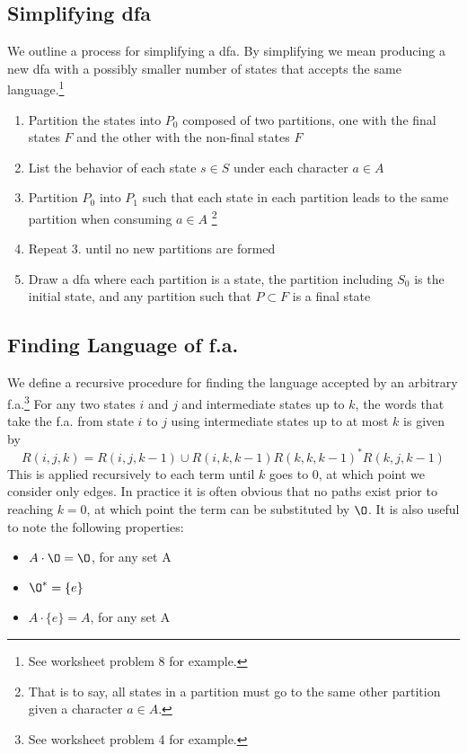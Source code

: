 \documentclass{article}
\begin{document}
		\subsection{Simplifying dfa}
		We outline a process for simplifying a dfa. By simplifying we mean producing a new dfa with a possibly smaller number of states that accepts the same language.\footnote{See worksheet problem 8 for example.}
		\begin{enumerate}
			\item Partition the states into $P_0$ composed of two partitions, one with the final states $F$ and the other with the non-final states $\overset{~}{F}$
			\item List the behavior of each state $s \in S$ under each character $a \in A$
			\item Partition $P_0$ into $P_1$ such that each state in each partition leads to the same partition when consuming $a \in A$ \footnote{That is to say, all states in a partition must go to the same other partition given a character $a \in A$.}
			\item Repeat 3. until no new partitions are formed
			\item Draw a dfa where each partition is a state, the partition including $S_0$ is the initial state, and any partition such that $P \subset F$ is a final state  
		\end{enumerate}
		\subsection{Finding Language of f.a.}
	We define a recursive procedure for finding the language accepted by an arbitrary f.a.\footnote{See worksheet problem 4 for example.} For any two states $i$ and $j$ and intermediate states up to $k$, the words that take the f.a. from state $i$ to $j$ using intermediate states up to at most $k$ is given by 
	$$R(i,j,k) = R(i,j,k-1) \cup R(i,k,k-1)R(k,k,k-1)^*R(k,j,k-1)$$
	This is applied recursively to each term until $k$ goes to 0, at which point we consider only edges. In practice it is often obvious that no paths exist prior to reaching $k=0$, at which point the term can be substituted by $\O$. It is also useful to note the following properties:
	\begin{itemize}
		\item $A\cdot \O = \O$, for any set A
		\item $\O^* = \{e\}$
		\item $A \cdot \{e\} = A$, for any set A
	\end{itemize}	 
\end{document}
